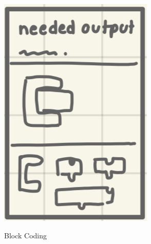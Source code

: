 	\begin{figure}[!htbp]
		\centering
		\begin{subfigure}[b]{0.2\linewidth}
			\includegraphics[width=\textwidth]{Ex3.png}\\
			\caption{Block Coding}
		\end{subfigure}
		\hspace{1em}
		\begin{subfigure}[b]{0.2\linewidth}

\end{subfigure}
\end{figure}
